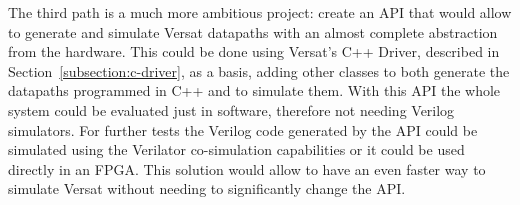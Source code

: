 The third path is a much more ambitious project: create an \ac{API} that would 
allow to generate and simulate Versat datapaths with an almost complete abstraction from 
the hardware. This could be done using Versat's C++ Driver, described in 
Section~\ref{subsection:c-driver}, as a basis, adding other classes to both generate the 
datapaths programmed in C++ and to simulate them. With this \ac{API} the whole system 
could be evaluated just in software, therefore not needing Verilog simulators. For 
further tests the Verilog code generated by the \ac{API} could be simulated using the 
Verilator co-simulation capabilities or it could be used directly in an \ac{FPGA}. This 
solution would allow to have an even faster way to simulate Versat without needing to 
significantly change the \ac{API}.
